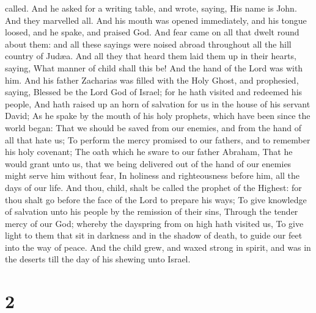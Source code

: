 called.  And he asked for a writing table, and wrote,
saying, His name is John. And they marvelled all.  And
his mouth was opened immediately, and his tongue loosed, and he spake,
and praised God.  And fear came on all that dwelt round
about them: and all these sayings were noised abroad throughout all the
hill country of Judæa.  And all they that heard them laid
them up in their hearts, saying, What manner of child shall this be! And
the hand of the Lord was with him.  And his father
Zacharias was filled with the Holy Ghost, and prophesied, saying,
 Blessed be the Lord God of Israel; for he hath visited
and redeemed his people,  And hath raised up an horn of
salvation for us in the house of his servant David;  As
he spake by the mouth of his holy prophets, which have been since the
world began:  That we should be saved from our enemies,
and from the hand of all that hate us;  To perform the
mercy promised to our fathers, and to remember his holy covenant;
 The oath which he sware to our father Abraham,
 That he would grant unto us, that we being delivered out
of the hand of our enemies might serve him without fear, 
In holiness and righteousness before him, all the days of our life.
 And thou, child, shalt be called the prophet of the
Highest: for thou shalt go before the face of the Lord to prepare his
ways;  To give knowledge of salvation unto his people by
the remission of their sins,  Through the tender mercy of
our God; whereby the dayspring from on high hath visited us,
 To give light to them that sit in darkness and in the
shadow of death, to guide our feet into the way of peace.
 And the child grew, and waxed strong in spirit, and was
in the deserts till the day of his shewing unto Israel.

\hypertarget{section-1}{%
\section{2}\label{section-1}}

